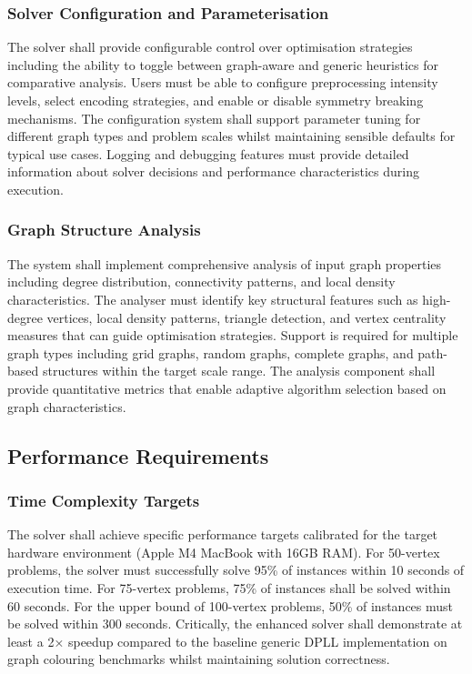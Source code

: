 \subsubsection{Solver Configuration and Parameterisation}
The solver shall provide configurable control over optimisation strategies including the ability to toggle between graph-aware and generic heuristics for comparative analysis. Users must be able to configure preprocessing intensity levels, select encoding strategies, and enable or disable symmetry breaking mechanisms. The configuration system shall support parameter tuning for different graph types and problem scales whilst maintaining sensible defaults for typical use cases. Logging and debugging features must provide detailed information about solver decisions and performance characteristics during execution.

\subsubsection{Graph Structure Analysis}
The system shall implement comprehensive analysis of input graph properties including degree distribution, connectivity patterns, and local density characteristics. The analyser must identify key structural features such as high-degree vertices, local density patterns, triangle detection, and vertex centrality measures that can guide optimisation strategies. Support is required for multiple graph types including grid graphs, random graphs, complete graphs, and path-based structures within the target scale range. The analysis component shall provide quantitative metrics that enable adaptive algorithm selection based on graph characteristics.

\subsection{Performance Requirements}

\subsubsection{Time Complexity Targets}
The solver shall achieve specific performance targets calibrated for the target hardware environment (Apple M4 MacBook with 16GB RAM). For 50-vertex problems, the solver must successfully solve 95\% of instances within 10 seconds of execution time. For 75-vertex problems, 75\% of instances shall be solved within 60 seconds. For the upper bound of 100-vertex problems, 50\% of instances must be solved within 300 seconds. Critically, the enhanced solver shall demonstrate at least a 2× speedup compared to the baseline generic DPLL implementation on graph colouring benchmarks whilst maintaining solution correctness.

